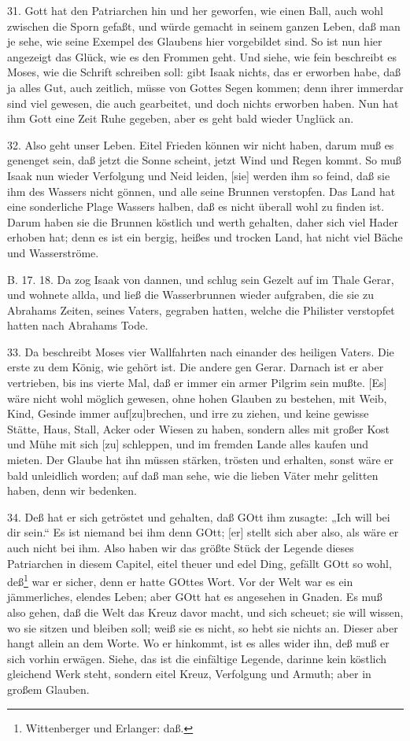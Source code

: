 31. Gott hat den Patriarchen hin und her geworfen, wie einen Ball, auch wohl zwischen die Sporn gefaßt, und würde gemacht in seinem ganzen Leben, daß man je sehe, wie seine Exempel des Glaubens hier vorgebildet sind. So ist nun hier angezeigt das Glück, wie es den Frommen geht. Und siehe, wie fein beschreibt es Moses, wie die Schrift schreiben soll: gibt Isaak nichts, das er erworben habe, daß ja alles Gut, auch zeitlich, müsse von Gottes Segen kommen; denn ihrer immerdar sind viel gewesen, die auch gearbeitet, und doch nichts erworben haben. Nun hat ihm Gott eine Zeit Ruhe gegeben, aber es geht bald wieder Unglück an.

32. Also geht unser Leben. Eitel Frieden können wir nicht haben, darum muß es genenget sein, daß jetzt die Sonne scheint, jetzt Wind und Regen kommt. So muß Isaak nun wieder Verfolgung und Neid leiden, [sie] werden ihm so feind, daß sie ihm des Wassers nicht gönnen, und alle seine Brunnen verstopfen. Das Land
hat eine sonderliche Plage Wassers halben, daß es nicht überall wohl zu finden ist. Darum haben sie die Brunnen köstlich und werth gehalten, daher sich viel Hader erhoben hat; denn es ist ein bergig, heißes und trocken Land, hat nicht viel Bäche und Wasserströme.

B. 17. 18. Da zog Isaak von dannen, und schlug sein Gezelt auf im Thale Gerar, und wohnete allda, und ließ die Wasserbrunnen wieder aufgraben, die sie zu Abrahams Zeiten, seines Vaters, gegraben hatten, welche die Philister verstopfet hatten nach Abrahams Tode.

33. Da beschreibt Moses vier Wallfahrten nach einander des heiligen Vaters. Die erste zu dem König, wie gehört ist. Die andere gen Gerar. Darnach ist er aber vertrieben, bis ins vierte Mal, daß er immer ein armer Pilgrim sein mußte. [Es] wäre nicht wohl möglich gewesen, ohne hohen Glauben zu bestehen, mit Weib, Kind, Gesinde immer auf[zu]brechen, und irre zu ziehen, und keine gewisse Stätte, Haus, Stall, Acker oder Wiesen zu haben, sondern alles mit großer Kost und Mühe mit sich [zu] schleppen, und im fremden Lande alles kaufen und mieten. Der Glaube hat ihn müssen stärken, trösten und erhalten, sonst wäre er bald unleidlich worden; auf daß man sehe, wie die lieben Väter mehr gelitten haben, denn wir bedenken.

34. Deß hat er sich getröstet und gehalten, daß GOtt ihm zusagte: „Ich will bei dir sein.“ Es ist niemand bei ihm denn GOtt; [er] stellt sich aber also, als wäre er auch nicht bei ihm. Also haben wir das größte Stück der Legende dieses Patriarchen in diesem Capitel, eitel theuer und edel Ding, gefällt GOtt so wohl, deß\footnote{Wittenberger und Erlanger: daß.} war er sicher, denn er hatte GOttes Wort. Vor der Welt war es ein jämmerliches, elendes Leben; aber GOtt hat es angesehen in Gnaden. Es muß also gehen, daß die Welt das Kreuz davor macht, und sich scheuet; sie will wissen, wo sie sitzen und bleiben soll; weiß sie es nicht, so hebt sie nichts an. Dieser aber hangt allein an dem Worte. Wo er hinkommt, ist es alles wider ihn, deß muß er sich vorhin erwägen. Siehe, das ist die einfältige Legende, darinne kein köstlich gleichend Werk steht, sondern eitel Kreuz, Verfolgung und Armuth; aber in großem Glauben.

